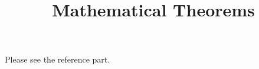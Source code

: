 \documentclass{amsart}
\begin{document}
\title{Mathematical Theorems}
\maketitle
Please see the reference part.

\nocite{*}


\end{document}

